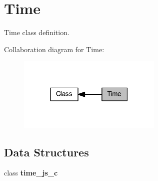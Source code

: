 \section{Time}
\label{group___time}


Time class definition.  


Collaboration diagram for Time\+:\nopagebreak
\begin{figure}[H]
\begin{center}
\leavevmode
\includegraphics[width=195pt]{group___time}
\end{center}
\end{figure}
\subsection*{Data Structures}
\begin{DoxyCompactItemize}
\item 
class \textbf{ time\+\_\+js\+\_\+c}
\end{DoxyCompactItemize}
